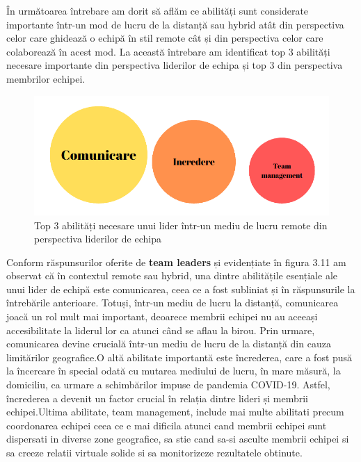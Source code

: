 \documentclass[a4paper, 12pt]{article}
\begin{document}
\begin{enumerate}[A)]
	\quad În următoarea întrebare am dorit să aflăm ce abilități sunt considerate importante într-un mod de lucru de la distanță sau hybrid atât din perspectiva celor care ghidează o echipă în stil remote cât și din perspectiva celor care colaborează în acest mod. La această întrebare am identificat top 3 abilități necesare importante din perspectiva liderilor de echipa și top 3 din perspectiva membrilor echipei.

	\quad \begin{figure}[!htb]
			\centering
			\includegraphics[width=15cm, height=6 cm]{"figures/team leaders remote.png"}
			\caption {Top 3 abilități necesare unui lider într-un mediu de lucru remote din perspectiva liderilor de echipa}\label{fig:four}
			
		\end{figure}
	
	\quad Conform răspunsurilor oferite de \textbf{team leaders} și evidențiate în figura 3.11 am observat că în contextul remote sau hybrid, una dintre abilitățile esențiale ale unui lider de echipă este comunicarea, ceea ce a fost subliniat și în răspunsurile la întrebările anterioare. Totuși, într-un mediu de lucru la distanță, comunicarea joacă un rol mult mai important, deoarece membrii echipei nu au aceeași accesibilitate la liderul lor ca atunci când se aflau la birou. Prin urmare, comunicarea devine crucială într-un mediu de lucru de la distanță din cauza limitărilor geografice.O altă abilitate importantă este încrederea, care a fost pusă la încercare în special odată cu mutarea mediului de lucru, în mare măsură, la domiciliu, ca urmare a schimbărilor impuse de pandemia COVID-19. Astfel, încrederea a devenit un factor crucial în relația dintre lideri și membrii echipei.Ultima abilitate, team management, include mai multe abilitati precum coordonarea echipei ceea ce e mai dificila atunci cand membrii echipei sunt dispersati in diverse zone geografice, sa stie cand sa-si asculte membrii echipei si sa creeze relatii virtuale solide si sa monitorizeze rezultatele obtinute. 
	

\end{enumerate}
\end{document}
